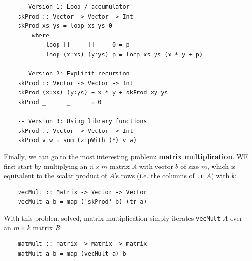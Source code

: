 \documentclass[a4paper]{extarticle}
\begin{document}
\begin{verbatim}
    -- Version 1: Loop / accumulator
    skProd :: Vector -> Vector -> Int
    skProd xs ys = loop xs ys 0
        where
            loop []     []     0 = p
            loop (x:xs) (y:ys) p = loop xs ys (x * y + p)

    -- Version 2: Explicit recursion
    skProd :: Vector -> Vector -> Int
    skProd (x:xs) (y:ys) = x * y + skProd xy ys
    skProd _      _      = 0

    -- Version 3: Using library functions
    skProd :: Vector -> Vector -> Int
    skProd v w = sum (zipWith (*) v w)
\end{verbatim}

Finally, we can go to the most interesting problem: \textbf{matrix multiplication.} WE first start by multiplying an \(n \times m\) matrix \(A\) with vector \(b\) of size \(m\), which is equivalent to the scalar product of \(A\)'s rows (i.e. the columns of \verb|tr| \(A\)) with \(b\):

\begin{verbatim}
    vecMult :: Matrix -> Vector -> Vector
    vecMult a b = map ('skProd' b) (tr a)
\end{verbatim}

With this problem solved, matrix multiplication simply iterates \verb|vecMult| \(A\) over an \(m \times k\) matrix \(B\):

\begin{verbatim}
    matMult :: Matrix -> Matrix -> matrix
    matMult a b = map (vecMult a) b
\end{verbatim}
\end{document}
